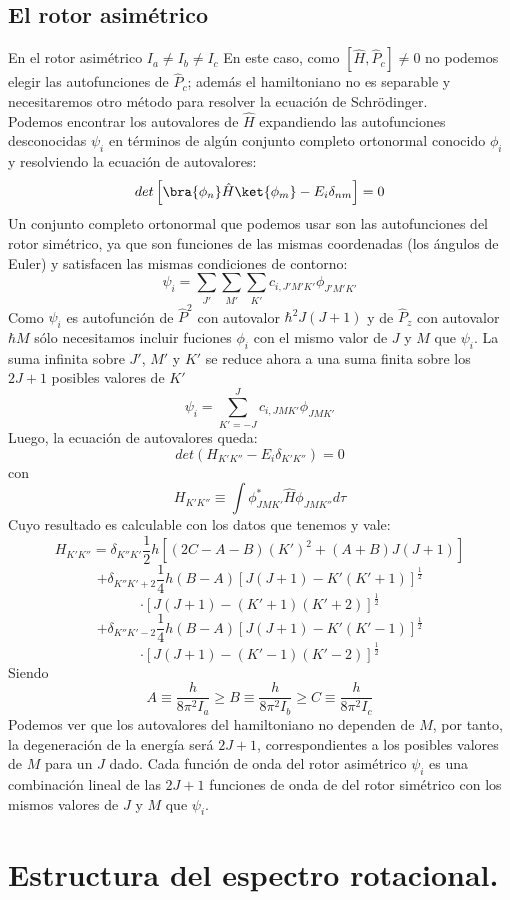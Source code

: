 \documentclass[a4paper]{article}
\begin{document}
\subsection{El rotor asimétrico}
En el rotor asimétrico $I_a\neq I_b\neq I_c$
En este caso, como $\left[\hat H,\hat P_c\right]\neq 0$ no podemos elegir las autofunciones de $\hat P_c$; además el hamiltoniano no es separable y necesitaremos otro método para resolver la ecuación de Schrödinger.\\
Podemos  encontrar los autovalores de $\hat H$ expandiendo las autofunciones desconocidas $\psi_i$ en términos de algún conjunto completo ortonormal conocido $\phi_i$ y resolviendo la ecuación de autovalores:
\begin{equation}
det \left[ \bra{\phi_n}\hat H\ket{\phi_m} - E_i\delta_{nm} \right]=0
\end{equation}
Un conjunto completo ortonormal que podemos usar son las autofunciones del rotor simétrico, ya que son funciones de las mismas coordenadas (los ángulos de Euler) y satisfacen las mismas condiciones de contorno:
\begin{equation}
\psi_i = \sum_{J'}\sum_{M'}\sum_{K'}c_{i,J'M'K'}\phi_{J'M'K'}
\end{equation}
Como $\psi_i$ es autofunción de $\hat P^2$ con autovalor $\hbar^2J(J+1)$ y de $\hat P_z$ con autovalor $\hbar M$ sólo necesitamos incluir fuciones $\phi_i$ con el mismo valor de $J$ y $M$ que $\psi_i$. La suma infinita sobre $J'$, $M'$ y $K'$ se reduce ahora a una suma finita sobre los $2J+1$ posibles valores de $K'$
\begin{equation}
\psi_i = \sum_{K'=-J}^Jc_{i,JMK'}\phi_{JMK'}
\end{equation}
Luego, la ecuación de autovalores queda:
\begin{equation}
det\left(H_{K'K''}-E_i\delta_{K'K''}\right)=0
\end{equation}
con
\begin{equation}
H_{K'K''}\equiv\int\phi^*_{JMK'}\hat H\phi_{JMK''}d\tau
\end{equation}
Cuyo resultado es calculable con los datos que tenemos y vale:
$$
H_{K'K''}=\delta_{K''K'}\frac{1}{2}h\left[\left(2C-A-B\right)\left(K'\right)^2+\left(A+B\right)J\left(J+1\right)\right]$$$$+\delta_{K''K'+2}\frac{1}{4}h\left(B-A\right)\left[J\left(J+1\right)-K'\left(K'+1\right)\right]^\frac{1}{2}$$$$\cdot\left[J\left(J+1\right)-\left(K'+1\right)\left(K'+2\right)\right]^\frac{1}{2}$$$$+\delta_{K''K'-2}\frac{1}{4}h\left(B-A\right)\left[J\left(J+1\right)-K'\left(K'-1\right)\right]^\frac{1}{2}$$
\begin{equation}
\cdot\left[J\left(J+1\right)-\left(K'-1\right)\left(K'-2\right)\right]^\frac{1}{2}
\end{equation}
Siendo
$$
A \equiv \frac{h}{8\pi^2I_a}\geq B\equiv \frac{h}{8\pi^2I_b}\geq C\equiv \frac{h}{8\pi^2I_c}
$$
Podemos ver que los autovalores del hamiltoniano no dependen de $M$, por tanto, la degeneración de la energía será $2J+1$, correspondientes a los posibles valores de $M$ para un $J$ dado.
Cada función de onda del rotor asimétrico $\psi_i$ es una combinación lineal de las $2J+1$ funciones de onda de del rotor simétrico con los mismos valores de $J$ y $M$ que $\psi_i$.

\section{Estructura del espectro rotacional.}
\newpage
\printbibliography
\end{document}
